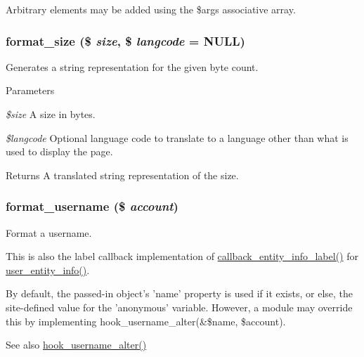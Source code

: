 Arbitrary elements may be added using the \$args associative array. \hypertarget{group__format_ga2a0075e7646fa2f399286272faa2956e}{
\subsubsection[{format\_\-size}]{\setlength{\rightskip}{0pt plus 5cm}format\_\-size (\$ {\em size}, \/  \$ {\em langcode} = {\ttfamily NULL})}}
\label{group__format_ga2a0075e7646fa2f399286272faa2956e}
Generates a string representation for the given byte count.


\begin{DoxyParams}{Parameters}
\item[{\em \$size}]A size in bytes. \item[{\em \$langcode}]Optional language code to translate to a language other than what is used to display the page.\end{DoxyParams}
\begin{DoxyReturn}{Returns}
A translated string representation of the size. 
\end{DoxyReturn}
\hypertarget{group__format_ga7124a026ecfacc51c57a75fcc083f136}{
\subsubsection[{format\_\-username}]{\setlength{\rightskip}{0pt plus 5cm}format\_\-username (\$ {\em account})}}
\label{group__format_ga7124a026ecfacc51c57a75fcc083f136}
Format a username.

This is also the label callback implementation of \hyperlink{group__callbacks_gae9464157712e8322955f45a671a8403d}{callback\_\-entity\_\-info\_\-label()} for \hyperlink{user_8module_a1dd64aa2b09d172ccab380135acb6af4}{user\_\-entity\_\-info()}.

By default, the passed-\/in object's 'name' property is used if it exists, or else, the site-\/defined value for the 'anonymous' variable. However, a module may override this by implementing hook\_\-username\_\-alter(\&\$name, \$account).

\begin{DoxySeeAlso}{See also}
\hyperlink{group__hooks_ga877faf93c9acc42bb54cbd01cd8d9453}{hook\_\-username\_\-alter()}
\end{DoxySeeAlso}

